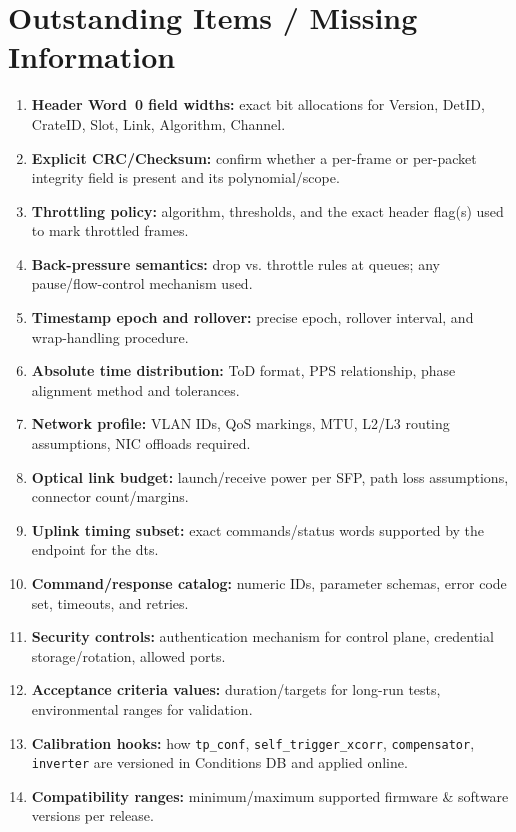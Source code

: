 
\section{Outstanding Items / Missing Information}
\label{sec:missing}
\begin{enumerate}
  \item \textbf{Header Word~0 field widths:} exact bit allocations for Version, DetID, CrateID, Slot, Link, Algorithm, Channel.
  \item \textbf{Explicit CRC/Checksum:} confirm whether a per-frame or per-packet integrity field is present and its polynomial/scope.
  \item \textbf{Throttling policy:} algorithm, thresholds, and the exact header flag(s) used to mark throttled frames.
  \item \textbf{Back-pressure semantics:} drop vs. throttle rules at queues; any pause/flow-control mechanism used.
  \item \textbf{Timestamp epoch and rollover:} precise epoch, rollover interval, and wrap-handling procedure.
  \item \textbf{Absolute time distribution:} ToD format, PPS relationship, phase alignment method and tolerances.
  \item \textbf{Network profile:} VLAN IDs, QoS markings, MTU, L2/L3 routing assumptions, NIC offloads required.
  \item \textbf{Optical link budget:} launch/receive power per SFP, path loss assumptions, connector count/margins.
  \item \textbf{Uplink timing subset:} exact commands/status words supported by the endpoint for the \gls{dts}.
  \item \textbf{Command/response catalog:} numeric IDs, parameter schemas, error code set, timeouts, and retries.
  \item \textbf{Security controls:} authentication mechanism for control plane, credential storage/rotation, allowed ports.
  \item \textbf{Acceptance criteria values:} duration/targets for long-run tests, environmental ranges for validation.
  \item \textbf{Calibration hooks:} how \texttt{tp\_conf}, \texttt{self\_trigger\_xcorr}, \texttt{compensator}, \texttt{inverter} are versioned in Conditions DB and applied online.
  \item \textbf{Compatibility ranges:} minimum/maximum supported firmware & software versions per release.
\end{enumerate}
